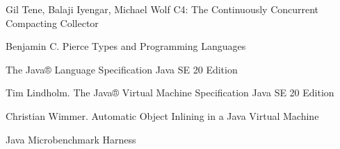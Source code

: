 \begingroup 
\renewcommand{\section}[2]{\anonsection{Библиографический список}}
\begin{flushleft}
\begin{thebibliography}{}

    Gil Tene, Balaji Iyengar, Michael Wolf C4: The Continuously Concurrent Compacting Collector

	Benjamin C. Pierce Types and Programming Languages

	The Java® Language Specification Java SE 20 Edition 

	Tim Lindholm. The Java® Virtual Machine Specification Java SE 20 Edition
	
	Christian Wimmer. Automatic Object Inlining in a Java Virtual Machine

	Java Microbenchmark Harness 
\end{thebibliography}
\end{flushleft}
\endgroup

\clearpage
